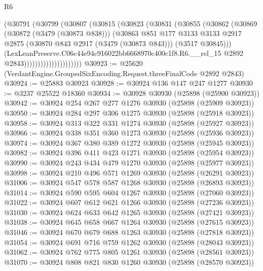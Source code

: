 \begin{lexlean}{R6}
\begin{coremodule}
                            (@30791
                              (@30799
                                (@30807
                                  (@30815
                                    (@30823
                                      (@30831
                                        (@30855
                                          (@30862
                                            (@30869
                                              (@30872 (@3479 (@30873 @838)))
                                              (@30863
                                                @851
                                                @177
                                                @3133
                                                @3133
                                                @2917
                                                @2875
                                                (@30870 @843 @2917 (@3479 (@30873 @843)))
                                                (@3517 @30845)))
                                            (LexLeanPreserve.C06c44e94c916022bb6668970c400c1f8.R6.__rel_15
                                              @2892
                                              @2843)))))))))))))))))))))
@30923 := @25620 (VerdantEngine.GroupedSixEncoding.Request.threeFinalCode @2892 @2843)
@30924 := @25883 @30923
@30928 := @30924 @136 @147 @247 @1277
@30930 := @3237 @25522 @18360
@30934 := @30928 @30930 (@25898 (@25900 @30923))
@30942 := @30924 @254 @267 @277 @1276 @30930 (@25898 (@25909 @30923))
@30950 := @30924 @284 @297 @306 @1275 @30930 (@25898 (@25918 @30923))
@30958 := @30924 @313 @322 @331 @1274 @30930 (@25898 (@25927 @30923))
@30966 := @30924 @338 @351 @360 @1273 @30930 (@25898 (@25936 @30923))
@30974 := @30924 @367 @380 @389 @1272 @30930 (@25898 (@25945 @30923))
@30982 := @30924 @396 @411 @423 @1271 @30930 (@25898 (@25954 @30923))
@30990 := @30924 @243 @434 @479 @1270 @30930 (@25898 (@25977 @30923))
@30998 := @30924 @210 @496 @571 @1269 @30930 (@25898 (@26291 @30923))
@31006 := @30924 @547 @578 @587 @1268 @30930 (@25898 (@26893 @30923))
@31014 := @30924 @590 @595 @604 @1267 @30930 (@25898 (@27060 @30923))
@31022 := @30924 @607 @612 @621 @1266 @30930 (@25898 (@27236 @30923))
@31030 := @30924 @624 @633 @642 @1265 @30930 (@25898 (@27421 @30923))
@31038 := @30924 @645 @658 @667 @1264 @30930 (@25898 (@27615 @30923))
@31046 := @30924 @670 @679 @688 @1263 @30930 (@25898 (@27818 @30923))
@31054 := @30924 @691 @716 @759 @1262 @30930 (@25898 (@28043 @30923))
@31062 := @30924 @762 @775 @805 @1261 @30930 (@25898 (@28561 @30923))
@31070 := @30924 @808 @821 @830 @1260 @30930 (@25898 (@28570 @30923))

\end{coremodule}
\end{lexlean}
